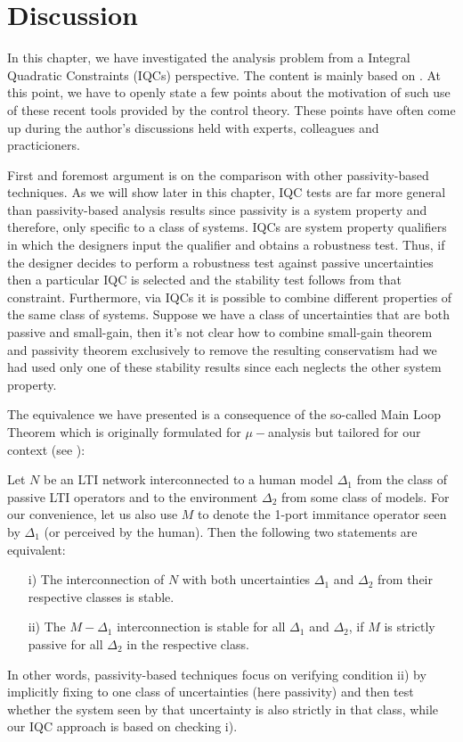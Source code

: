 \section{Discussion}


In this chapter, we have investigated the analysis problem from a Integral Quad\-ratic Constraints (IQCs) perspective. 
The content is mainly based on \cite{polattro}. At this point, we have to openly state a few points
about the motivation of such use of these recent tools provided by the control
theory. These points have often come up during the author's discussions held with experts, colleagues and
practicioners.

First and foremost argument is on the comparison with other passivity-based techniques. As we will show later 
in this chapter, IQC tests are far more general than passivity-based analysis results since passivity is a 
system property and therefore, only specific to a class of systems. IQCs are system property qualifiers in which 
the designers input the qualifier and obtains a robustness test. Thus, if the designer decides to perform a 
robustness test against passive uncertainties then a particular IQC is selected and the stability test follows
from that constraint. Furthermore, via IQCs it is possible to combine different properties of the same class 
of systems. Suppose we have a class of uncertainties that are both passive and small-gain, then it's not clear
how to combine small-gain theorem and passivity theorem exclusively to remove the resulting conservatism had we 
had used only one of these stability results since each neglects the other system property. 

The equivalence we have presented is a consequence of the so-called Main Loop Theorem which is originally formulated 
for $\mu-$analysis but tailored for our context 
(see \cite[Thm. 11.7]{zhoubook}): 
\begin{thm}
Let $N$ be an LTI network interconnected to a human model $\Delta_1$ from the 
class of passive LTI operators and to the environment $\Delta_2$ from some class of models. For our convenience, 
let us also use $M$ to denote the 1-port immitance operator seen by $\Delta_1$ (or perceived by the human). 
Then the following two statements are equivalent:
\begin{enumerate}
	\item[i)] The interconnection of $N$ with both uncertainties $\Delta_1$ and $\Delta_2$ from their respective classes is stable.
	\item[ii)] The $M-\Delta_1$ interconnection is stable for all $\Delta_1$ and $\Delta_2$, if $M$ is strictly passive for all $\Delta_2$ in the respective class.
\end{enumerate}
\end{thm}
In other words, passivity-based techniques focus on verifying condition ii) by implicitly fixing to one class of 
uncertainties (here passivity) and then test whether the system seen by that uncertainty is also strictly in that
class, while our IQC approach is based on checking i).

